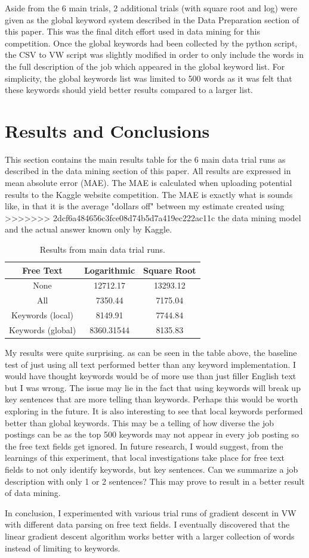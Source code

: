 \documentclass[conference]{IEEEtran}
\begin{document}
Aside from the 6 main trials, 2 additional trials (with square root and log) were
given as the global keyword system described in the Data Preparation section of
this paper. This was the final ditch effort used in data mining for this competition.
Once the global keywords had been collected by the python script, the CSV to
VW script was slightly modified in order to only include the words in the full
description of the job which appeared in the global keyword list. For simplicity,
the global keywords list was limited to 500 words as it was felt that these keywords
should yield better results compared to a larger list.

\section{Results and Conclusions}

This section contains the main results table for the 6 main data trial runs as
described in the data mining section of this paper. All results are expressed in
mean absolute error (MAE). The MAE is calculated when uploading potential
results to the Kaggle website competition. The MAE is exactly what is sounds
like, in that it is the average "dollars oﬀ" between my estimate created using
>>>>>>> 2dcf6a484656c3fce08d74b5d7a419ec222ac11c
the data mining model and the actual answer known only by Kaggle.

\begin{table}[h]
\begin{center}
\begin{tabular}{| c | c | c |}
\hline
Free Text & Logarithmic & Square Root \\
\hline
\hline
None & 12712.17 & 13293.12 \\ \hline
All & 7350.44 & 7175.04 \\ \hline
Keywords (local) & 8149.91 & 7744.84 \\ \hline
Keywords (global) & 8360.31544 & 8135.83 \\ \hline
\end{tabular}
\end{center}
\caption{Results from main data trial runs.\label{tab:results}}
\end{table}

My results were quite surprising. as can be seen in the table above, the baseline test of just
using all text performed better than any keyword implementation. I would have thought keywords
would be of more use than just filler English text but I was wrong. The issue may lie in
the fact that using keywords will break up key sentences that are more telling
than keywords. Perhaps this would be worth exploring in the future. It is also interesting
to see that local keywords performed better than global keywords. This may be a telling of 
how diverse the job postings can be as the top 500 keywords may not appear in every job
posting so the free text fields get ignored. In future research, I would suggest, from
the learnings of this experiment, that local investigations take place for free text fields
to not only identify keywords, but key sentences. Can we summarize a job description with only
1 or 2 sentences? This may prove to result in a better result of data mining.

In conclusion, I experimented with various trial runs of gradient descent in
VW with different data parsing on free text fields. I eventually discovered
that the linear gradient descent algorithm works better with a larger collection
of words instead of limiting to keywords.

\end{document}
